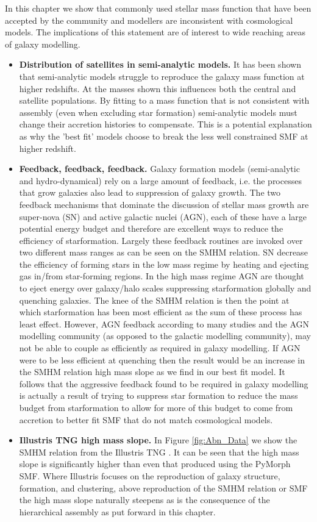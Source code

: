 In this chapter we show that commonly used stellar mass function that have been accepted by the community and modellers are inconsistent with \LCDM cosmological models. The implications of this statement are of interest to wide reaching areas of galaxy modelling. 
\begin{itemize}
    \item \textbf{Distribution of satellites in semi-analytic models.} It has been shown \citep[e.g.][]{Asquith2018CosmicModels} that semi-analytic models struggle to reproduce the galaxy mass function at higher redshifts. At the masses shown this influences both the central and satellite populations. By fitting to a mass function that is not consistent with \LCDM assembly (even when excluding star formation) semi-analytic models must change their accretion histories to compensate. This is a potential explanation as why the 'best fit' models choose to break the less well constrained SMF at higher redshift.
    \item \textbf{Feedback, feedback, feedback.} Galaxy formation models (semi-analytic and hydro-dynamical) rely on a large amount of feedback, i.e. the processes that grow galaxies also lead to suppression of galaxy growth. The two feedback mechanisms that dominate the discussion of stellar mass growth are super-nova (SN) and active galactic nuclei (AGN), each of these have a large potential energy budget and therefore are excellent ways to reduce the efficiency of starformation. Largely these feedback routines are invoked over two different mass ranges as can be seen on the SMHM relation. SN decrease the efficiency of forming stars in the low mass regime by heating and ejecting gas in/from star-forming regions. In the high mass regime AGN are thought to eject energy over galaxy/halo scales suppressing starformation globally and quenching galaxies. The knee of the SMHM relation is then the point at which starformation has been most efficient as the sum of these process has least effect. However, AGN feedback according to many studies and the AGN modelling community (as opposed to the galactic modelling community), may not be able to couple as efficiently as required in galaxy modelling. If AGN were to be less efficient at quenching then the result would be an increase in the SMHM relation high mass slope as we find in our best fit model. It follows that the aggressive feedback found to be required in galaxy modelling is actually a result of trying to suppress star formation to reduce the mass budget from starformation to allow for more of this budget to come from accretion to better fit SMF that do not match cosmological models.
    \item \textbf{Illustris TNG high mass slope.} In Figure \ref{fig:Abn_Data} we show the SMHM relation from the Illustris TNG \citep{Nelson2019TheRelease}. It can be seen that the high mass slope is significantly higher than even that produced using the PyMorph SMF. Where Illustris focuses on the reproduction of galaxy structure, formation, and clustering, above reproduction of the SMHM relation or SMF the high mass slope naturally steepens as is the consequence of the hierarchical assembly as put forward in this chapter. 
\end{itemize}


